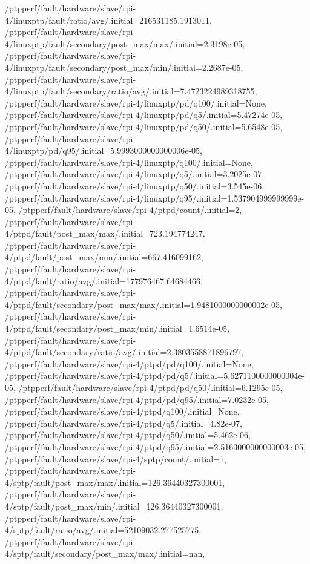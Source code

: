 {    /ptpperf/fault/hardware/slave/rpi-4/linuxptp/fault/ratio/avg/.initial=216531185.1913011,
    /ptpperf/fault/hardware/slave/rpi-4/linuxptp/fault/secondary/post_max/max/.initial=2.3198e-05,
    /ptpperf/fault/hardware/slave/rpi-4/linuxptp/fault/secondary/post_max/min/.initial=2.2687e-05,
    /ptpperf/fault/hardware/slave/rpi-4/linuxptp/fault/secondary/ratio/avg/.initial=7.4723224989318755,
    /ptpperf/fault/hardware/slave/rpi-4/linuxptp/pd/q100/.initial=None,
    /ptpperf/fault/hardware/slave/rpi-4/linuxptp/pd/q5/.initial=5.47274e-05,
    /ptpperf/fault/hardware/slave/rpi-4/linuxptp/pd/q50/.initial=5.6548e-05,
    /ptpperf/fault/hardware/slave/rpi-4/linuxptp/pd/q95/.initial=5.9993000000000006e-05,
    /ptpperf/fault/hardware/slave/rpi-4/linuxptp/q100/.initial=None,
    /ptpperf/fault/hardware/slave/rpi-4/linuxptp/q5/.initial=3.2025e-07,
    /ptpperf/fault/hardware/slave/rpi-4/linuxptp/q50/.initial=3.545e-06,
    /ptpperf/fault/hardware/slave/rpi-4/linuxptp/q95/.initial=1.537904999999999e-05,
    /ptpperf/fault/hardware/slave/rpi-4/ptpd/count/.initial=2,
    /ptpperf/fault/hardware/slave/rpi-4/ptpd/fault/post_max/max/.initial=723.194774247,
    /ptpperf/fault/hardware/slave/rpi-4/ptpd/fault/post_max/min/.initial=667.416099162,
    /ptpperf/fault/hardware/slave/rpi-4/ptpd/fault/ratio/avg/.initial=177976467.64684466,
    /ptpperf/fault/hardware/slave/rpi-4/ptpd/fault/secondary/post_max/max/.initial=1.9481000000000002e-05,
    /ptpperf/fault/hardware/slave/rpi-4/ptpd/fault/secondary/post_max/min/.initial=1.6514e-05,
    /ptpperf/fault/hardware/slave/rpi-4/ptpd/fault/secondary/ratio/avg/.initial=2.3803558871896797,
    /ptpperf/fault/hardware/slave/rpi-4/ptpd/pd/q100/.initial=None,
    /ptpperf/fault/hardware/slave/rpi-4/ptpd/pd/q5/.initial=5.6271100000000004e-05,
    /ptpperf/fault/hardware/slave/rpi-4/ptpd/pd/q50/.initial=6.1295e-05,
    /ptpperf/fault/hardware/slave/rpi-4/ptpd/pd/q95/.initial=7.0232e-05,
    /ptpperf/fault/hardware/slave/rpi-4/ptpd/q100/.initial=None,
    /ptpperf/fault/hardware/slave/rpi-4/ptpd/q5/.initial=4.82e-07,
    /ptpperf/fault/hardware/slave/rpi-4/ptpd/q50/.initial=5.462e-06,
    /ptpperf/fault/hardware/slave/rpi-4/ptpd/q95/.initial=2.5163000000000003e-05,
    /ptpperf/fault/hardware/slave/rpi-4/sptp/count/.initial=1,
    /ptpperf/fault/hardware/slave/rpi-4/sptp/fault/post_max/max/.initial=126.36440327300001,
    /ptpperf/fault/hardware/slave/rpi-4/sptp/fault/post_max/min/.initial=126.36440327300001,
    /ptpperf/fault/hardware/slave/rpi-4/sptp/fault/ratio/avg/.initial=52109032.277525775,
    /ptpperf/fault/hardware/slave/rpi-4/sptp/fault/secondary/post_max/max/.initial=nan,
}
